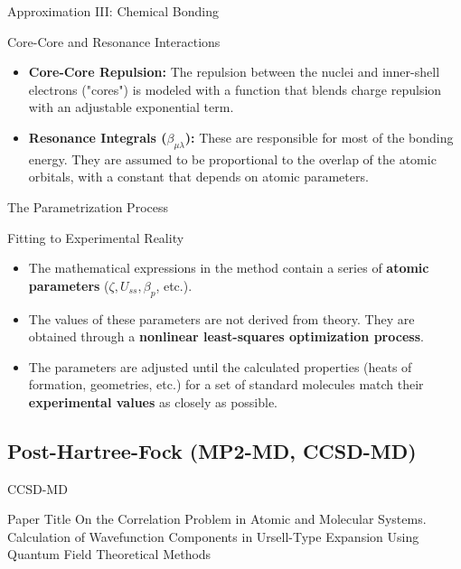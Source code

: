\begin{frame}{Approximation III: Chemical Bonding}
    \begin{block}{Core-Core and Resonance Interactions}
        \begin{itemize}
            \item \textbf{Core-Core Repulsion:} The repulsion between the nuclei and inner-shell electrons ("cores") is modeled with a function that blends charge repulsion with an adjustable exponential term.
            \pause
            \bigskip
            \item \textbf{Resonance Integrals ($\beta_{\mu\lambda}$):} These are responsible for most of the bonding energy. They are assumed to be proportional to the overlap of the atomic orbitals, with a constant that depends on atomic parameters.
        \end{itemize}
    \end{block}
\end{frame}


\begin{frame}{The Parametrization Process}
    \begin{block}{Fitting to Experimental Reality}
        \begin{itemize}
            \item The mathematical expressions in the method contain a series of \textbf{atomic parameters} ($\zeta, U_{ss}, \beta_p$, etc.).
            \pause
            \bigskip
            \item The values of these parameters are not derived from theory. They are obtained through a \textbf{nonlinear least-squares optimization process}.
            \pause
            \bigskip
            \item The parameters are adjusted until the calculated properties (heats of formation, geometries, etc.) for a set of standard molecules match their \textbf{experimental values} as closely as possible.
        \end{itemize}
    \end{block}
\end{frame}

\subsection{Post-Hartree-Fock (MP2-MD, CCSD-MD)}

\begin{frame}{CCSD-MD}
	\begin{block}{Paper Title}
	On the Correlation Problem in Atomic and Molecular Systems. Calculation of Wavefunction Components in Ursell-Type Expansion Using Quantum Field Theoretical Methods 
	\end{block}
\end{frame}


